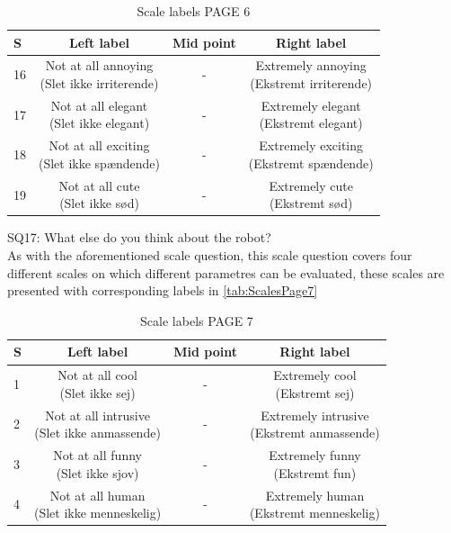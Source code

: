 %
\begin{table}[H]
	\centering
\caption{Scale labels PAGE 6}
	\label{tab:ScalesPage6} 
	\begin{tabular}{l|c|c|c}
		S     & Left label & Mid point & Right label \\\hline
		16   & \makecell{Not at all annoying\\(Slet ikke irriterende)}  & - & \makecell{Extremely annoying \\(Ekstremt irriterende)}        \\\hline
		17   & \makecell{Not at all elegant \\(Slet ikke elegant)} & - & \makecell{Extremely elegant \\(Ekstremt elegant)}         \\\hline
		18   & \makecell{Not at all exciting\\(Slet ikke spændende)} & - & \makecell{Extremely exciting \\(Ekstremt spændende)}         \\\hline
	 	19   & \makecell{Not at all cute\\(Slet ikke sød)} & - & \makecell{Extremely cute \\(Ekstremt sød)}               
	\end{tabular}        
\end{table}
\noindent
%
SQ17: What else do you think about the robot?\\%
As with the aforementioned scale question, this scale question covers four different scales on which different parametres can be evaluated, these scales are presented with corresponding labels in \autoref{tab:ScalesPage7}  
%
\begin{table}[H]
	\centering
\caption{Scale labels PAGE 7}
	\label{tab:ScalesPage7} 
	\begin{tabular}{l|c|c|c}
		S    & Left label & Mid point & Right label \\\hline
		1   & \makecell{Not at all cool\\(Slet ikke sej)}  & - & \makecell{Extremely cool \\(Ekstremt sej)}        \\\hline
		2   & \makecell{Not at all intrusive \\(Slet ikke anmassende)} & - & \makecell{Extremely intrusive \\(Ekstremt anmassende)}         \\\hline
		3   & \makecell{Not at all funny\\(Slet ikke sjov)} & - & \makecell{Extremely funny \\(Ekstremt fun)}         \\\hline
	 	4   & \makecell{Not at all human \\(Slet ikke menneskelig)} & - & \makecell{Extremely human \\(Ekstremt menneskelig)}               
	\end{tabular}        
\end{table}

